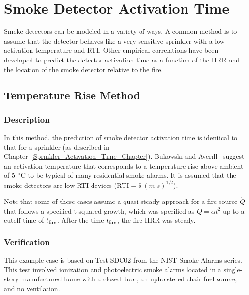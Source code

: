 
\chapter{Smoke Detector Activation Time}
\label{Smoke_Detector_Activation_Time_Chapter}

Smoke detectors can be modeled in a variety of ways. A common method is to assume that the detector behaves like a very sensitive sprinkler with a low activation temperature and RTI. Other empirical correlations have been developed to predict the detector activation time as a function of the HRR and the location of the smoke detector relative to the fire.

\section{Temperature Rise Method}

\subsection*{Description}

In this method, the prediction of smoke detector activation time is identical to that for a sprinkler (as described in Chapter~\ref{Sprinkler_Activation_Time_Chapter}). Bukowski and Averill~\cite{Bukowski:2} suggest an activation temperature that corresponds to a temperature rise above ambient of 5~$^\circ$C to be typical of many residential smoke alarms. It is assumed that the smoke detectors are low-RTI devices ($\textrm{RTI}=5~\si{(m.s)^{1/2}}$).

Note that some of these cases assume a quasi-steady approach for a fire source $\dot Q$ that follows a specified t-squared growth, which was specified as $\dot Q = \alpha t^2$ up to a cutoff time of $t\sb{fire}$. After the time $t\sb{fire}$, the fire HRR was steady.


\clearpage


\subsection*{Verification}

This example case is based on Test SDC02 from the NIST Smoke Alarms series. This test involved ionization and photoelectric smoke alarms located in a single-story manufactured home with a closed door, an upholstered chair fuel source, and no ventilation.

